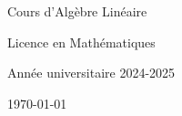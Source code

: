 \begin{titlepage}
    \centering
    \vspace*{1cm}

    \Huge
    Cours d'Algèbre Linéaire

    \vspace{0.5cm}

    \LARGE
    Licence en Mathématiques

    \vspace{1.5cm}


    \vfill

    \Large
    Année universitaire 2024-2025

    \vspace{0.8cm}

    \today
\end{titlepage}
